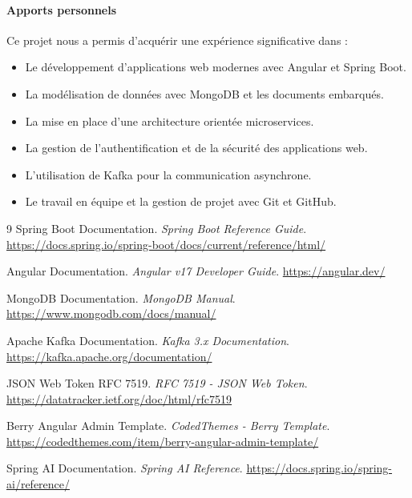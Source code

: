 \documentclass[12pt,a4paper,twoside]{report}
\begin{document}
\paragraph{Apports personnels}
Ce projet nous a permis d'acquérir une expérience significative dans :
\begin{itemize}[leftmargin=*]
  \item Le développement d'applications web modernes avec Angular et Spring Boot.
  \item La modélisation de données avec MongoDB et les documents embarqués.
  \item La mise en place d'une architecture orientée microservices.
  \item La gestion de l'authentification et de la sécurité des applications web.
  \item L'utilisation de Kafka pour la communication asynchrone.
  \item Le travail en équipe et la gestion de projet avec Git et GitHub.
\end{itemize}

\begin{thebibliography}{9}
Spring Boot Documentation. \textit{Spring Boot Reference Guide}. \url{https://docs.spring.io/spring-boot/docs/current/reference/html/}

Angular Documentation. \textit{Angular v17 Developer Guide}. \url{https://angular.dev/}

MongoDB Documentation. \textit{MongoDB Manual}. \url{https://www.mongodb.com/docs/manual/}

Apache Kafka Documentation. \textit{Kafka 3.x Documentation}. \url{https://kafka.apache.org/documentation/}

JSON Web Token RFC 7519. \textit{RFC 7519 - JSON Web Token}. \url{https://datatracker.ietf.org/doc/html/rfc7519}

Berry Angular Admin Template. \textit{CodedThemes - Berry Template}. \url{https://codedthemes.com/item/berry-angular-admin-template/}

Spring AI Documentation. \textit{Spring AI Reference}. \url{https://docs.spring.io/spring-ai/reference/}
\end{thebibliography}
\end{document}
